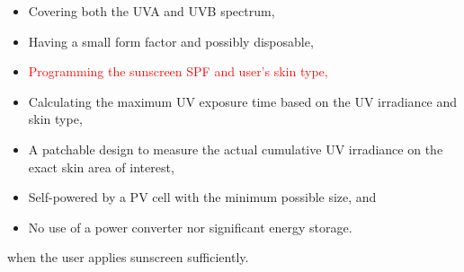 \documentclass[onecolumn]{IEEEconf}
\begin{document}
\begin{description}
\begin{itemize}
\item Covering both the UVA and UVB spectrum,
\item Having a small form factor and possibly disposable,
\item \textcolor{red}{Programming the sunscreen SPF and user's skin type,}
\item Calculating the maximum UV exposure time based on the UV irradiance and skin type,
\item A patchable design to measure the actual cumulative UV irradiance on the exact skin area of interest,
\item Self-powered by a PV cell with the minimum possible size, and
\item No use of a power converter nor significant energy storage.
\end{itemize}



when the user applies sunscreen sufficiently. 

\end{description}

\pagebreak
\end{document}
